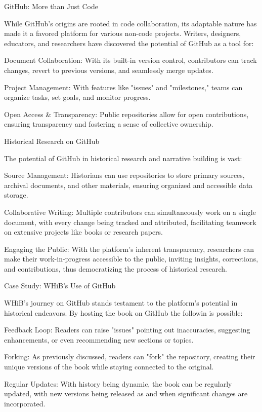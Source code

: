 \documentclass[a4paper,12pt]{book}
\begin{document}
GitHub: More than Just Code

While GitHub's origins are rooted in code collaboration, its adaptable nature has made it a favored platform for various non-code projects. Writers, designers, educators, and researchers have discovered the potential of GitHub as a tool for:

Document Collaboration: With its built-in version control, contributors can track changes, revert to previous versions, and seamlessly merge updates.

Project Management: With features like "issues" and "milestones," teams can organize tasks, set goals, and monitor progress.

Open Access & Transparency: Public repositories allow for open contributions, ensuring transparency and fostering a sense of collective ownership.

Historical Research on GitHub

The potential of GitHub in historical research and narrative building is vast:

Source Management: Historians can use repositories to store primary sources, archival documents, and other materials, ensuring organized and accessible data storage.

Collaborative Writing: Multiple contributors can simultaneously work on a single document, with every change being tracked and attributed, facilitating teamwork on extensive projects like books or research papers.

Engaging the Public: With the platform's inherent transparency, researchers can make their work-in-progress accessible to the public, inviting insights, corrections, and contributions, thus democratizing the process of historical research.

Case Study: WHiB's Use of GitHub

WHiB's journey on GitHub stands testament to the platform's potential in historical endeavors. By hosting the book on GitHub the followin is possible:

Feedback Loop: Readers can raise "issues" pointing out inaccuracies, suggesting enhancements, or even recommending new sections or topics.

Forking: As previously discussed, readers can "fork" the repository, creating their unique versions of the book while staying connected to the original.

Regular Updates: With history being dynamic, the book can be regularly updated, with new versions being released as and when significant changes are incorporated.
\end{document}
